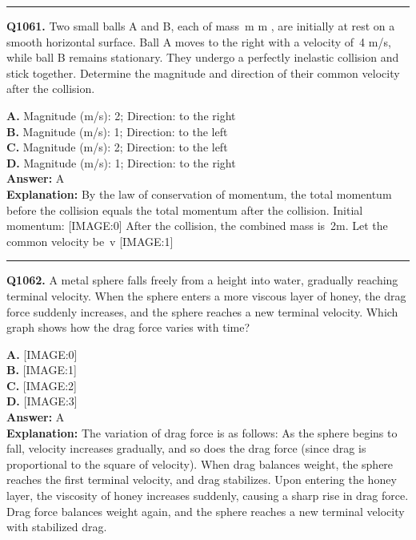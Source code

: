 \documentclass[12pt]{article}
\begin{document}
\hrule
\vspace{1em}


\noindent
\textbf{Q1061.} Two small balls A and B, each of mass m
m
, are initially at rest on a smooth horizontal surface. Ball A moves to the right with a velocity of 4
m/s, while ball B remains stationary. They undergo a perfectly inelastic collision and stick together. Determine the magnitude and direction of their common velocity after the collision.



\textbf{A.} Magnitude (m/s): 2; Direction: to the right \\
\textbf{B.} Magnitude (m/s): 1; Direction: to the left \\
\textbf{C.} Magnitude (m/s): 2; Direction: to the left \\
\textbf{D.} Magnitude (m/s): 1; Direction: to the right \\

\textbf{Answer:} A \\
\textbf{Explanation:} By the law of conservation of momentum, the total momentum before the collision equals the total momentum after the collision.
Initial momentum:
[IMAGE:0]
After the collision, the combined mass is 2m. Let the common velocity be v
[IMAGE:1]

\hrule
\vspace{1em}


\noindent
\textbf{Q1062.} A metal sphere falls freely from a height into water, gradually reaching terminal velocity. When the sphere enters a more viscous layer of honey, the drag force suddenly increases, and the sphere reaches a new terminal velocity. Which graph shows how the drag force varies with time?



\textbf{A.} [IMAGE:0] \\
\textbf{B.} [IMAGE:1] \\
\textbf{C.} [IMAGE:2] \\
\textbf{D.} [IMAGE:3] \\

\textbf{Answer:} A \\
\textbf{Explanation:} The variation of drag force is as follows:
As the sphere begins to fall, velocity increases gradually, and so does the drag force (since drag is proportional to the square of velocity).
When drag balances weight, the sphere reaches the first terminal velocity, and drag stabilizes.
Upon entering the honey layer, the viscosity of honey increases suddenly, causing a sharp rise in drag force.
Drag force balances weight again, and the sphere reaches a new terminal velocity with stabilized drag.
\end{document}
